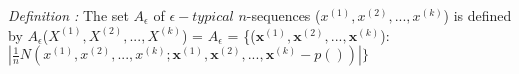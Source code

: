 \documentclass[preview]{standalone}
\begin{document}
\begin{center}
\textit{Definition :} The set $A_{\epsilon}$ of $\epsilon -typical$ $n$-sequences ($x^{(1)},x^{(2)},...,x^{(k)}$) is defined by $A_{\epsilon}$($X^{(1)},X^{(2)},...,X^{(k)}$) = $A_{\epsilon}$ = \{($\textbf{x}^{(1)},\textbf{x}^{(2)},...,\textbf{x}^{(k)}$):$|\frac{1}{n} N ( x^{(1)},x^{(2)},...,x^{(k)};\textbf{x}^{(1)},\textbf{x}^{(2)},...,\textbf{x}^{(k)} - p() )|\}$
\end{center}
\end{document}
